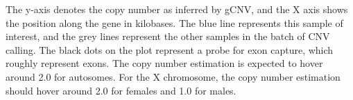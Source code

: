 The y-axis denotes the copy number as inferred by gCNV, and the X axis shows the position along the gene in kilobases. The blue line represents this sample of interest, and the grey lines represent the other samples in the batch of CNV calling. The black dots on the plot represent a probe for exon capture, which roughly represent exons. The copy number estimation is expected to hover around 2.0 for autosomes. For the X chromosome, the copy number estimation should hover around 2.0 for females and 1.0 for males.
